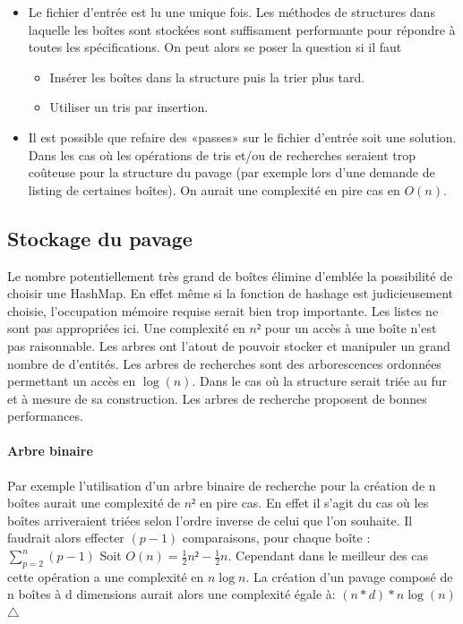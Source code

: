 \begin{itemize}
\item
  Le fichier d'entrée est lu une unique fois. Les méthodes  de structures dans laquelle les boîtes sont stockées sont suffisament performante pour répondre à toutes les spécifications. On peut alors se poser la question si il faut 
  \begin{itemize}
  \item
    Insérer les boîtes dans la structure puis la trier plus tard.
  \item
    Utiliser un tris par insertion.
  \end{itemize}
\item
  Il est possible que refaire des «passes» sur le fichier d'entrée soit une solution. Dans les cas où les opérations de tris et/ou de recherches seraient trop coûteuse pour la structure du pavage (par exemple lors d'une demande de listing de certaines boîtes). On aurait une complexité en pire cas en $O(n)$. 
\end{itemize}
\subsection{Stockage du pavage}
Le nombre potentiellement très grand de boîtes élimine d'emblée la possibilité de choisir une HashMap. En effet même si la fonction de hashage est judicieusement choisie, l'occupation mémoire requise serait bien trop importante. Les listes ne sont pas appropriées ici. Une complexité en $n²$ pour un accès à une boîte n'est pas raisonnable. Les arbres ont l'atout de pouvoir stocker et manipuler un grand nombre de d'entités. Les arbres de recherches sont des arborescences ordonnées permettant un accès en $\log(n)$. Dans le cas où la structure serait triée au fur et à mesure de sa construction. Les arbres de recherche proposent de bonnes performances.



\paragraph{Arbre binaire}
Par exemple l'utilisation d'un arbre binaire de recherche pour la création de n boîtes aurait une complexité de $n²$ en pire cas. En effet il s'agit du cas où les boîtes arriveraient triées selon l'ordre inverse de celui que l'on souhaite. Il faudrait alors effecter $(p-1)$ comparaisons, pour chaque boîte :  $\sum_{p=2}^{n}(p-1)$  Soit $O(n)=\frac{1}{2}n²-\frac{1}{2}n$. Cependant dans le meilleur des cas cette opération a une complexité en $n\log{n}$.
La création d'un pavage composé de n boîtes à d dimensions aurait alors une complexité égale à: $(n*d)*n\log(n)$ $\triangle$
\clearpage
